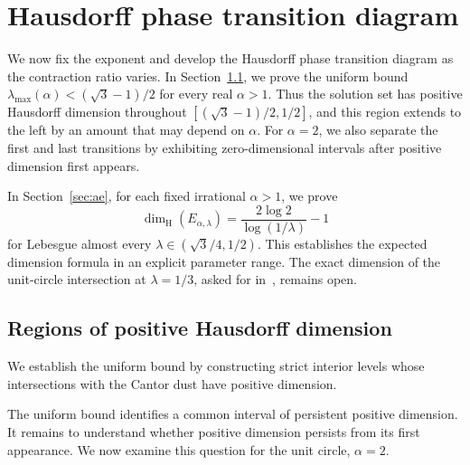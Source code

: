 \documentclass[11pt,a4paper]{amsart}
\numberwithin{equation}{section}
\theoremstyle{definition}
\begin{document}
\section{Hausdorff phase transition diagram}\label{sec:last}

We now fix the exponent and develop the Hausdorff phase transition
diagram as the contraction ratio varies. In
Section~\ref{subsec:last-upper}, we prove the uniform bound
\(\lambda_{\max}(\alpha)<(\sqrt3-1)/2\) for every real \(\alpha>1\).
Thus the solution set has positive Hausdorff dimension throughout
\([(\sqrt3-1)/2,1/2]\), and this region extends to the left by
an amount that may depend on \(\alpha\). For \(\alpha=2\), we also separate the
first and last transitions by exhibiting zero-dimensional intervals
after positive dimension first appears.

In Section~\ref{sec:ae}, for each fixed irrational \(\alpha>1\), we prove
\[
\dim_{\mathrm H}(E_{\alpha,\lambda})
=\frac{2\log2}{\log(1/\lambda)}-1
\]
for Lebesgue almost every \(\lambda\in(\sqrt3/4,1/2)\).
This establishes the expected dimension formula in an explicit
parameter range. The exact dimension of the unit-circle intersection
at \(\lambda=1/3\), asked for in~\cite{Jiang2026}, remains open.

\subsection{Regions of positive Hausdorff dimension}\label{subsec:last-upper}

We establish the uniform bound by constructing strict interior
levels whose intersections with the Cantor dust have positive dimension.




The uniform bound identifies a common interval of persistent
positive dimension. It remains to understand whether positive dimension
persists from its first appearance. We now examine this question for
the unit circle, \(\alpha=2\).
\end{document}
